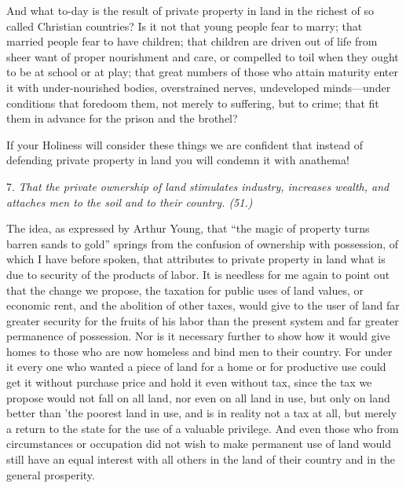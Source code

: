 \documentclass{book}
\begin{document}
And what to-day is the result of private property in land in the richest of so called Christian countries? Is it not that young people fear to marry; that married people fear to have children; that children are driven out of life from sheer want of proper nourishment and care, or compelled to toil when they ought to be at school or at play; that great numbers of those who attain maturity enter it with under-nourished bodies, overstrained nerves, undeveloped minds—under conditions that foredoom them, not merely to suffering, but to crime; that fit them in advance for the prison and the brothel?

If your Holiness will consider these things we are confident that instead of defending private property in land you will condemn it with anathema!

7. \emph{That the private ownership of land stimulates industry, increases wealth, and attaches men to the soil and to their country. (51.)}

The idea, as expressed by Arthur Young, that “the magic of property turns barren sands to gold” springs from the confusion of ownership with possession, of which I have before spoken, that attributes to private property in land what is due to security of the products of labor. It is needless for me again to point out that the change we propose, the taxation for public uses of land values, or economic rent, and the abolition of other taxes, would give to the user of land far greater security for the fruits of his labor than the present system and far greater permanence of possession. Nor is it necessary further to show how it would give homes to those who are now homeless and bind men to their country. For under it every one who wanted a piece of land for a home or for productive use could get it without purchase price and hold it even without tax, since the tax we propose would not fall on all land, nor even on all land in use, but only on land better than ’the poorest land in use, and is in reality not a tax at all, but merely a return to the state for the use of a valuable privilege. And even those who from circumstances or occupation did not wish to make permanent use of land would still have an equal interest with all others in the land of their country and in the general prosperity.
\end{document}
